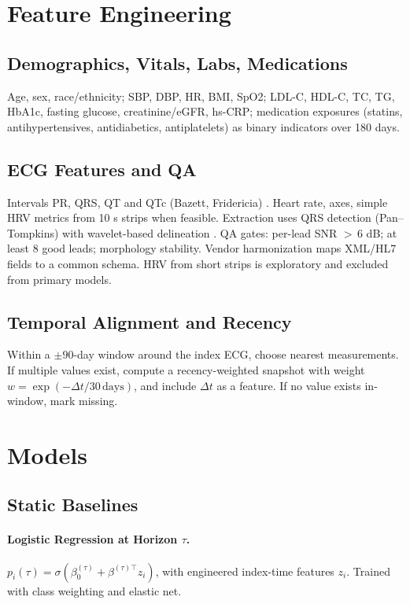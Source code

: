 \documentclass[11pt]{article}
\begin{document}
\section{Feature Engineering}
\subsection{Demographics, Vitals, Labs, Medications}
Age, sex, race/ethnicity; SBP, DBP, HR, BMI, SpO2; LDL-C, HDL-C, TC, TG, HbA1c, fasting glucose, creatinine/eGFR, hs-CRP; medication exposures (statins, antihypertensives, antidiabetics, antiplatelets) as binary indicators over 180 days.

\subsection{ECG Features and QA}
Intervals PR, QRS, QT and QTc (Bazett, Fridericia) \cite{Bazett1920,Fridericia1920}. Heart rate, axes, simple HRV metrics from 10 s strips when feasible. Extraction uses QRS detection (Pan--Tompkins) with wavelet-based delineation \cite{PanTompkins1985}. QA gates: per-lead SNR $>\,6$ dB; at least 8 good leads; morphology stability. Vendor harmonization maps XML/HL7 fields to a common schema. HRV from short strips is exploratory and excluded from primary models.

\subsection{Temporal Alignment and Recency}
Within a \(\pm 90\)-day window around the index ECG, choose nearest measurements. If multiple values exist, compute a recency-weighted snapshot with weight \(w=\exp(-\Delta t/30\,\text{days})\), and include \(\Delta t\) as a feature. If no value exists in-window, mark missing.

\section{Models}
\subsection{Static Baselines}
\paragraph{Logistic Regression at Horizon \(\tau\).} \(p_i(\tau)=\sigma(\beta_0^{(\tau)}+\beta^{(\tau)\top} z_i)\), with engineered index-time features \(z_i\). Trained with class weighting and elastic net.
\end{document}
